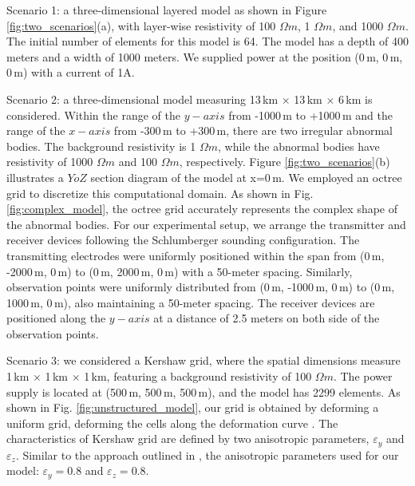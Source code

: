 \documentclass[extra, referee]{gji}
\begin{document}
Scenario 1: a three-dimensional layered model as shown in Figure
\ref{fig:two_scenarios}(a), with layer-wise resistivity of 100 $\Omega m$, 1
$\Omega m$, and 1000 $\Omega m$. The initial number of elements for this model
is 64. The model has a depth of 400 meters and a width of 1000 meters. We
supplied power at the position (0\,m, 0\,m, 0\,m) with a current of 1A.

Scenario 2: a three-dimensional model measuring 13\,km × 13\,km × 6\,km is
considered. Within the range of the $y-axis$ from -1000\,m to +1000\,m and the
range of the $x-axis$ from -300\,m to +300\,m, there are two irregular abnormal
bodies. The background resistivity is 1 $\Omega m$, while the abnormal bodies
have resistivity of 1000 $\Omega m$ and 100 $\Omega m$, respectively. Figure
\ref{fig:two_scenarios}(b) illustrates a $YoZ$ section diagram of the model at
x=0\,m. We employed an octree grid to discretize this computational domain. As
shown in Fig. \ref{fig:complex_model}, the octree grid accurately represents the
complex shape of the abnormal bodies. For our experimental setup, we arrange the
transmitter and receiver devices following the Schlumberger sounding
configuration. The transmitting electrodes were uniformly positioned within the
span from (0\,m, -2000\,m, 0\,m) to (0\,m, 2000\,m, 0\,m) with a 50-meter
spacing. Similarly, observation points were uniformly distributed from (0\,m,
-1000\,m, 0\,m) to (0\,m, 1000\,m, 0\,m), also maintaining a 50-meter spacing.
The receiver devices are positioned along the $y-axis$ at a distance of 2.5
meters on both side of the observation points.

Scenario 3: we considered a Kershaw grid, where the spatial dimensions measure
1\,km × 1\,km × 1\,km, featuring a background resistivity of 100 $\Omega m$. The
power supply is located at (500\,m, 500\,m, 500\,m), and the model has 2299
elements. As shown in Fig. \ref{fig:unstructured_model}, our grid is obtained by
deforming a uniform grid, deforming the cells along the deformation curve
\citep{Kershaw1981}. The characteristics of Kershaw grid are defined by two
anisotropic parameters, $\varepsilon_y$ and $\varepsilon_z$. Similar to the
approach outlined in \citep{Camier2023}, the anisotropic parameters used for our
model: $\varepsilon_y=0.8$ and $\varepsilon_z=0.8$.
\end{document}
